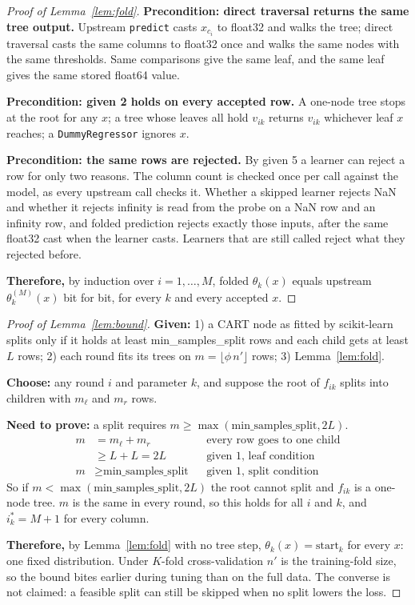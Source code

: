 \documentclass{article}
\begin{document}
\begin{proof}[Proof of Lemma~\ref{lem:fold}]
\textbf{Precondition: direct traversal returns the same tree output.} Upstream \texttt{predict} casts $x_{c_i}$ to float32 and walks the tree; direct traversal casts the same columns to float32 once and walks the same nodes with the same thresholds. Same comparisons give the same leaf, and the same leaf gives the same stored float64 value.

\textbf{Precondition: given 2 holds on every accepted row.} A one-node tree stops at the root for any $x$; a tree whose leaves all hold $v_{ik}$ returns $v_{ik}$ whichever leaf $x$ reaches; a \texttt{DummyRegressor} ignores $x$. 

\textbf{Precondition: the same rows are rejected.} By given 5 a learner can reject a row for only two reasons. The column count is checked once per call against the model, as every upstream call checks it. Whether a skipped learner rejects NaN and whether it rejects infinity is read from the probe on a NaN row and an infinity row, and folded prediction rejects exactly those inputs, after the same float32 cast when the learner casts. Learners that are still called reject what they rejected before.

\textbf{Therefore,} by induction over $i = 1,\dots,M$, folded $\theta_k(x)$ equals upstream $\theta_k^{(M)}(x)$ bit for bit, for every $k$ and every accepted $x$.
\end{proof}

\begin{proof}[Proof of Lemma~\ref{lem:bound}]
\textbf{Given:}
1) a CART node \citep{breiman1984cart} as fitted by scikit-learn splits only if it holds at least min\_samples\_split rows and each child gets at least $L$ rows;
2) each round fits its trees on $m = \lfloor \phi\, n' \rfloor$ rows;
3) Lemma~\ref{lem:fold}.

\textbf{Choose:} any round $i$ and parameter $k$, and suppose the root of $f_{ik}$ splits into children with $m_\ell$ and $m_r$ rows.

\textbf{Need to prove:} a split requires $m \ge \max(\text{min\_samples\_split}, 2L)$.
\begin{align*}
m &= m_\ell + m_r && \text{every row goes to one child}\\
  &\ge L + L = 2L && \text{given 1, leaf condition}\\
m &\ge \text{min\_samples\_split} && \text{given 1, split condition}
\end{align*}
So if $m < \max(\text{min\_samples\_split}, 2L)$ the root cannot split and $f_{ik}$ is a one-node tree. $m$ is the same in every round, so this holds for all $i$ and $k$, and $i^*_k = M + 1$ for every column.

\textbf{Therefore,} by Lemma~\ref{lem:fold} with no tree step, $\theta_k(x) = \text{start}_k$ for every $x$: one fixed distribution. Under $K$-fold cross-validation $n'$ is the training-fold size, so the bound bites earlier during tuning than on the full data. The converse is not claimed: a feasible split can still be skipped when no split lowers the loss.
\end{proof}
\end{document}
